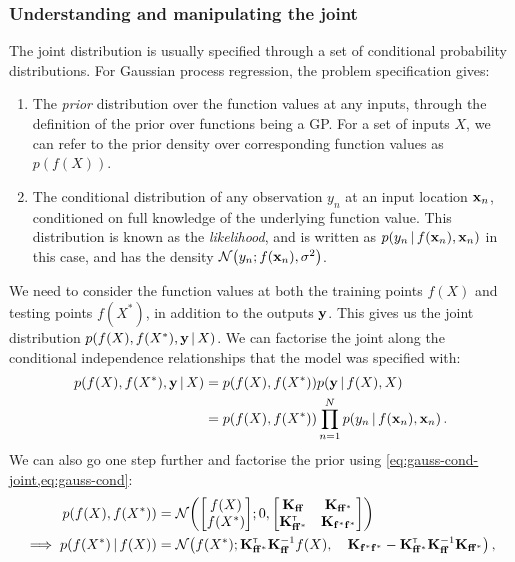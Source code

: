 \documentclass[a4paper]{article}
\newcommand{\K}{\mathbf{K}}
\theoremstyle{definition}
\begin{document}
\subsubsection{Understanding and manipulating the joint}
The joint distribution is usually specified through a set of conditional probability distributions. For Gaussian process regression, the problem specification gives:
\begin{enumerate}
\item The \emph{prior} distribution over the function values at any inputs, through the definition of the prior over functions being a GP. For a set of inputs $X$, we can refer to the prior density over corresponding function values as $p(f(X))$.
\item The conditional distribution of any observation $y_n$ at an input location $\mathbf{x}_n$, conditioned on full knowledge of the underlying function value. This distribution is known as the \emph{likelihood}, and is written as $p(y_n\,|\, f(\mathbf{x}_n), \mathbf{x}_n)$ in this case, and has the density $\NormDist{y_n; f(\vx_n), \sigma^2}$.
\end{enumerate}
We need to consider the function values at both the training points $f(X)$ and testing points $f(X^*)$, in addition to the outputs $\mathbf{y}$. This gives us the joint distribution $p(f(X), f(X^*), \mathbf{y}\,|\, X)$.
We can factorise the joint along the conditional independence relationships that the model was specified with:
\begin{align}
p(f(X), f(X^*), \mathbf{y}\,|\, X) &= p(f(X), f(X^*))p(\mathbf{y}\,|\, f(X), X) \\
&= p(f(X), f(X^*)) \prod_{n=1}^N p(y_n\,|\, f(\mathbf{x}_n), \mathbf{x}_n) \,.
\end{align}
We can also go one step further and factorise the prior using \cref{eq:gauss-cond-joint,eq:gauss-cond}:
\newcommand{\Kff}{\K_{\vf\vf}}
\newcommand{\Kfp}{\K_{\vf\vf^*}}
\newcommand{\Kpp}{\K_{\vf^*\vf^*}}
\begin{align}
p(f(X), f(X^*)) &= \NormDist{\begin{bmatrix}f(X) \\ f(X^*)\end{bmatrix}; 0, \begin{bmatrix}\Kff & \K_{\vf\vf^*} \\ \K_{\vf\vf^*}\transpose & \K_{\vf^*\vf^*}\end{bmatrix}} \\ %
\implies p(f(X^*)\given f(X)) &= \NormDist{f(X^*); \Kfp\transpose\Kff\inv f(X), \quad \Kpp  - \Kfp\transpose\Kff\inv\Kfp} \label{eq:gp-prior-factorisation} \,,
\end{align}
\end{document}
